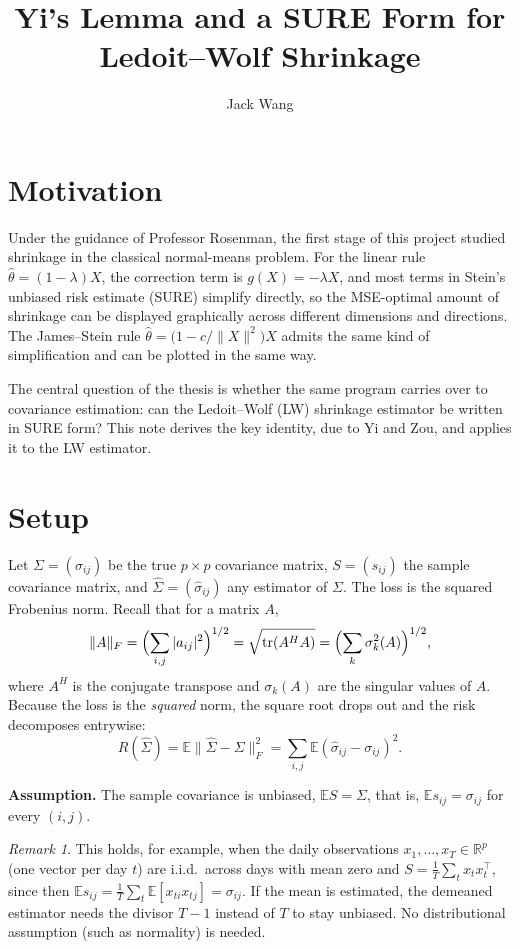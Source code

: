 \documentclass[11pt]{article}
\title{Yi's Lemma and a SURE Form for Ledoit--Wolf Shrinkage}
\author{Jack Wang}
\date{}
\theoremstyle{remark}
\newtheorem*{remark}{Remark}
\newcommand{\E}{\mathbb{E}}
\newcommand{\tr}{\operatorname{tr}}
\begin{document}
\maketitle
\vspace{-2em}

\section{Motivation}

Under the guidance of Professor Rosenman, the first stage of this project
studied shrinkage in the classical normal-means problem. For the linear rule
$\hat\theta = (1-\lambda)X$, the correction term is $g(X) = -\lambda X$, and
most terms in Stein's unbiased risk estimate (SURE) simplify directly, so the
MSE-optimal amount of shrinkage can be displayed graphically across different
dimensions and directions. The James--Stein rule
$\hat\theta = \bigl(1 - c/\|X\|^2\bigr)X$ admits the same kind of
simplification and can be plotted in the same way.

The central question of the thesis is whether the same program carries over
to covariance estimation: can the Ledoit--Wolf (LW) shrinkage estimator be
written in SURE form? This note derives the key identity, due to Yi and Zou,
and applies it to the LW estimator.

\section{Setup}

Let $\Sigma = (\sigma_{ij})$ be the true $p\times p$ covariance matrix, $S =
(s_{ij})$ the sample covariance matrix, and $\hat\Sigma = (\hat\sigma_{ij})$
any estimator of $\Sigma$. The loss is the squared Frobenius norm. Recall that
for a matrix $A$,
\[
\|A\|_F = \Bigl(\sum_{i,j} |a_{ij}|^2\Bigr)^{1/2}
        = \sqrt{\tr(A^{H}A)}
        = \Bigl(\sum_k \sigma_k^2(A)\Bigr)^{1/2},
\]
where $A^H$ is the conjugate transpose and $\sigma_k(A)$ are the singular
values of $A$. Because the loss is the \emph{squared} norm, the square root
drops out and the risk decomposes entrywise:
\[
R(\hat\Sigma) = \E\|\hat\Sigma - \Sigma\|_F^2
              = \sum_{i,j} \E(\hat\sigma_{ij} - \sigma_{ij})^2 .
\]

\textbf{Assumption.} The sample covariance is unbiased, $\E S = \Sigma$, that is,
$\E s_{ij} = \sigma_{ij}$ for every $(i,j)$.

\begin{remark}
This holds, for example, when the daily observations $x_1,\dots,x_T \in
\mathbb{R}^p$ (one vector per day $t$) are i.i.d.\ across days with mean zero
and $S = \frac1T\sum_t x_t x_t^\top$, since then
$\E s_{ij} = \frac1T\sum_t \E[x_{ti}x_{tj}] = \sigma_{ij}$. If the mean is
estimated, the demeaned estimator needs the divisor $T-1$ instead of $T$ to
stay unbiased. No distributional assumption (such as normality) is needed.
\end{remark}
\end{document}
